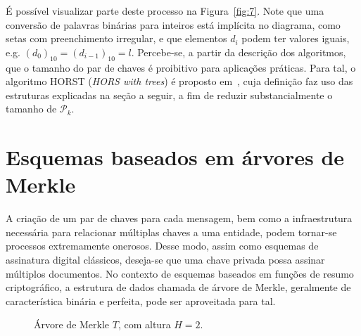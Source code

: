 \documentclass[12pt]{report}
\newcommand{\pk}{\mathcal{P}_k}
\newcommand{\hash}[2][]{\mathcal{H}^{#1}(#2)}
\newcommand{\concat}{\, \vert \vert \,}
\begin{document}
É possível visualizar parte deste processo na Figura~\ref{fig:7}. Note que uma conversão de palavras binárias para inteiros está implícita no diagrama, como setas com preenchimento irregular, e que elementos $d_i$ podem ter valores iguais, e.g. $(d_{0})_{10} = (d_{i-1})_{10} = l$. Percebe-se, a partir da descrição dos algoritmos, que o tamanho do par de chaves é proibitivo para aplicações práticas. Para tal, o algoritmo HORST (\emph{HORS with trees}) é proposto em~\cite{Bernstein2015}, cuja definição faz uso das estruturas explicadas na seção a seguir, a fim de reduzir substancialmente o tamanho de $\pk{}$.

\section{Esquemas baseados em árvores de Merkle}

A criação de um par de chaves para cada mensagem, bem como a infraestrutura
necessária para relacionar múltiplas chaves a uma entidade, podem tornar-se
processos extremamente onerosos. Desse modo, assim como esquemas de assinatura
digital clássicos, deseja-se que uma chave privada possa assinar múltiplos
documentos. No contexto de esquemas baseados em funções de resumo
criptográfico, a estrutura de dados chamada de árvore de Merkle, geralmente de
característica binária e perfeita, pode ser aproveitada para tal.

\begin{figure}[ht]
  \centering
  \caption{Árvore de Merkle $T$, com altura $H = 2$.}
  \label{fig:4}
\end{figure}
\end{document}
